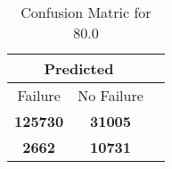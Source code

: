 \begin{table}[] 
\caption{Confusion Matric for 80.0} 
\label{Table: Prediction Accuracy-None80.0DecisionTrees100EKF-ignoreReflection-Reflection} 
\centering 
\begin{tabular} 
 {@{}ccc@{}} 
\toprule 
\multicolumn{2}{c}{\textbf{Predicted}}
 \\ \midrule 
\multicolumn{1}{|c|}{Failure} & 
\multicolumn{1}{c|}{No Failure}
 \\ \midrule 
\multicolumn{1}{|c|}{\color{green}\textbf{125730}} & 
\multicolumn{1}{c|}{\color{green}\textbf{31005}}
 \\ \midrule 
\multicolumn{1}{|c|}{\color{red}\textbf{2662}} & 
\multicolumn{1}{c|}{\color{red}\textbf{10731}}
 \\ \bottomrule 
\end{tabular} 
\end{table} 
